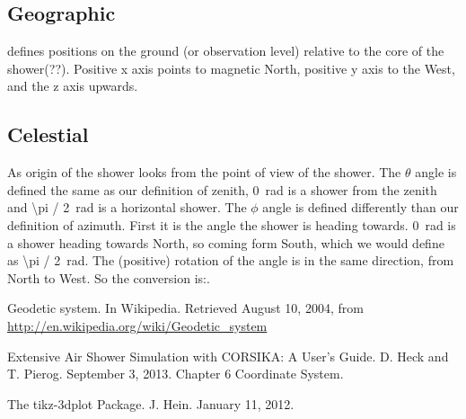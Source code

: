 \subsection{Geographic}

\corsika defines positions on the ground (or observation level) relative
to the core of the shower(??). Positive x axis points to magnetic North,
positive y axis to the West, and the z axis upwards.


\subsection{Celestial}

As origin of the shower \corsika looks from the point of view of the
shower. The $\theta$ angle is defined the same as our definition of
zenith, \SI{0}{\radian} is a shower from the zenith and
\SI{\pi / 2}{\radian} is a horizontal shower. The $\phi$ angle is
defined differently than our definition of azimuth. First it is the
angle the shower is heading towards. \SI{0}{\radian} is a shower heading
towards North, so coming form South, which we would define as
\SI{\pi / 2}{\radian}. The (positive) rotation of the angle is
in the same direction, from North to West. So the conversion is:.




\begin{thebibliography}{9}

Geodetic system. In Wikipedia. Retrieved August 10, 2004,
from \url{http://en.wikipedia.org/wiki/Geodetic_system}

Extensive Air Shower Simulation with CORSIKA: A User’s Guide. D. Heck
and T. Pierog. September 3, 2013. Chapter 6 Coordinate System.

The tikz-3dplot Package. J. Hein. January 11, 2012.

\end{thebibliography}
